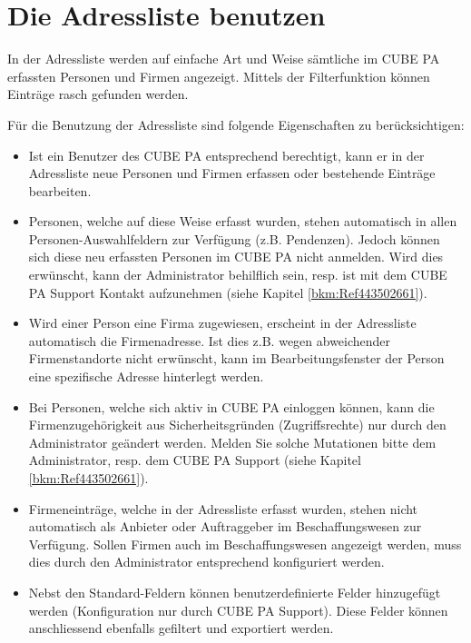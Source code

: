
\clearpage
\section{Die Adressliste benutzen}
\label{bkm:Ref443738751}
In der Adressliste werden auf einfache Art und Weise sämtliche im CUBE PA erfassten Personen und Firmen angezeigt. Mittels der Filterfunktion können Einträge rasch gefunden werden.

\vspace{\baselineskip}

Für die Benutzung der Adressliste sind folgende Eigenschaften zu berücksichtigen:

\begin{itemize}
\item
Ist ein Benutzer des CUBE PA entsprechend berechtigt, kann er in der Adressliste neue Personen und Firmen erfassen oder bestehende Einträge bearbeiten.

\item
Personen, welche auf diese Weise erfasst wurden, stehen automatisch in allen Personen-Auswahlfeldern zur Verfügung (z.B. Pendenzen). Jedoch können sich diese neu erfassten Personen im CUBE PA nicht anmelden. Wird dies erwünscht, kann der Administrator behilflich sein, resp. ist mit dem CUBE PA Support Kontakt aufzunehmen (siehe Kapitel
\ref{bkm:Ref443502661}).

\item
Wird einer Person eine Firma zugewiesen, erscheint in der Adressliste automatisch die Firmenadresse. Ist dies z.B. wegen abweichender Firmenstandorte nicht erwünscht, kann im Bearbeitungsfenster der Person eine spezifische Adresse
hinterlegt werden.

\item
Bei Personen, welche sich aktiv in CUBE PA einloggen können, kann die Firmenzugehörigkeit aus Sicherheitsgründen (Zugriffsrechte) nur durch den Administrator geändert werden. Melden Sie solche Mutationen bitte dem Administrator, resp. dem CUBE PA Support (siehe Kapitel \ref{bkm:Ref443502661}).

\item
Firmeneinträge, welche in der Adressliste erfasst wurden, stehen nicht automatisch als Anbieter oder Auftraggeber im Beschaffungswesen zur Verfügung. Sollen Firmen auch im Beschaffungswesen angezeigt werden, muss dies durch den Administrator entsprechend konfiguriert werden.

\item
Nebst den Standard-Feldern können benutzerdefinierte Felder hinzugefügt werden (Konfiguration nur durch CUBE PA Support). Diese Felder können anschliessend ebenfalls gefiltert und exportiert werden.

\end{itemize}

